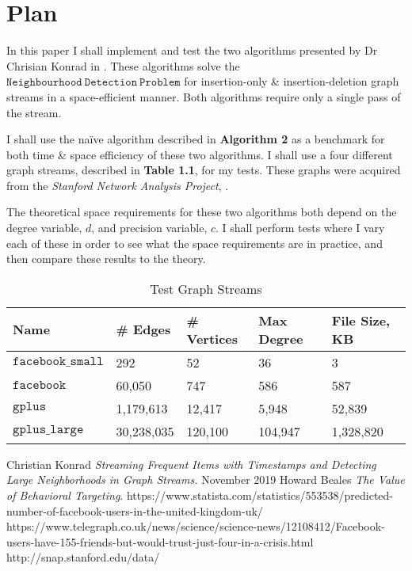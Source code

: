 \documentclass[11pt,twoside,a4paper]{report}
\begin{document}
\section{Plan}
In this paper I shall implement and test the two algorithms presented by Dr Chrisian Konrad in \cite{orig}. These algorithms solve the $\mathtt{Neighbourhood\ Detection\ Problem}$ for insertion-only \& insertion-deletion graph streams in a space-efficient manner. Both algorithms require only a single pass of the stream.
\par I shall use the na\"ive algorithm described in \textbf{Algorithm 2} as a benchmark for both time \& space efficiency of these two algorithms. I shall use a four different graph streams, described in \textbf{Table 1.1}, for my tests. %
These graphs were acquired from the \textit{Stanford Network Analysis Project}, \cite{SNAP}.
\par The theoretical space requirements for these two algorithms both depend on the degree variable, $d$, and precision variable, $c$. I shall perform tests where I vary each of these in order to see what the space requirements are in practice, and then compare these results to the theory.

\begin{table}[h]
\caption{Test Graph Streams}
\begin{tabular}{|l|l|l|l|l|}
\hline
Name&\# Edges&\# Vertices&Max Degree&File Size, KB\\\hline
$\mathtt{facebook\_small}$&292&52&36&3\\
$\mathtt{facebook}$&60,050&747&586&587\\
$\mathtt{gplus}$&1,179,613&12,417&5,948&52,839\\
$\mathtt{gplus\_large}$&30,238,035&120,100&104,947&1,328,820\\\hline
\end{tabular}
\label{Tab:Tcr}
\end{table}

\begin{thebibliography}{9}
 Christian Konrad \textit{Streaming Frequent Items with Timestamps and Detecting Large Neighborhoods in Graph Streams.} November 2019
 Howard Beales \textit{The Value of Behavioral Targeting}.
 https://www.statista.com/statistics/553538/predicted-number-of-facebook-users-in-the-united-kingdom-uk/
 https://www.telegraph.co.uk/news/science/science-news/12108412/Facebook-users-have-155-friends-but-would-trust-just-four-in-a-crisis.html
http://snap.stanford.edu/data/
\end{thebibliography}
\end{document}

